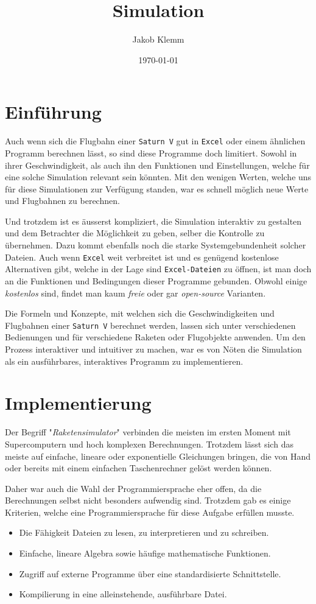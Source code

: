 \documentclass[11pt]{article}
\author{Jakob Klemm}
\date{\today}
\title{Simulation}
\begin{document}
\maketitle
\tableofcontents

\section{Einführung}
\label{sec:orgc7617af}
Auch wenn sich die Flugbahn einer \texttt{Saturn V} gut in \texttt{Excel} oder einem ähnlichen
Programm berechnen lässt, so sind diese Programme doch limitiert. Sowohl in
ihrer Geschwindigkeit, als auch ihn den Funktionen und Einstellungen, welche für
eine solche Simulation relevant sein könnten. Mit den wenigen Werten, welche uns
für diese Simulationen zur Verfügung standen, war es schnell möglich neue Werte
und Flugbahnen zu berechnen.

Und trotzdem ist es äusserst kompliziert, die Simulation interaktiv zu gestalten
und dem Betrachter die Möglichkeit zu geben, selber die Kontrolle zu übernehmen.
Dazu kommt ebenfalls noch die starke Systemgebundenheit solcher Dateien. Auch
wenn \texttt{Excel} weit verbreitet ist und es genügend kostenlose Alternativen gibt,
welche in der Lage sind \texttt{Excel-Dateien} zu öffnen, ist man doch an die Funktionen
und Bedingungen dieser Programme gebunden. Obwohl einige \emph{kostenlos} sind, findet
man kaum \emph{freie} oder gar \emph{open-source} Varianten.

Die Formeln und Konzepte, mit welchen sich die Geschwindigkeiten und Flugbahnen
einer \texttt{Saturn V} berechnet werden, lassen sich unter verschiedenen Bedienungen und
für verschiedene Raketen oder Flugobjekte anwenden. Um den Prozess interaktiver
und intuitiver zu machen, war es von Nöten die Simulation als ein ausführbares,
interaktives Programm zu implementieren.
\section{Implementierung}
\label{sec:orgc5299e9}
Der Begriff "\emph{Raketensimulator}" verbinden die meisten im ersten Moment mit
Supercomputern und hoch komplexen Berechnungen. Trotzdem lässt sich das meiste
auf einfache, lineare oder exponentielle Gleichungen bringen, die von Hand oder
bereits mit einem einfachen Taschenrechner gelöst werden können.

Daher war auch die Wahl der Programmiersprache eher offen, da die Berechnungen
selbst nicht besonders aufwendig sind. Trotzdem gab es einige Kriterien, welche
eine Programmiersprache für diese Aufgabe erfüllen musste.
\begin{itemize}
\item Die Fähigkeit Dateien zu lesen, zu interpretieren und zu schreiben.
\item Einfache, lineare Algebra sowie häufige mathematische Funktionen.
\item Zugriff auf externe Programme über eine standardisierte Schnittstelle.
\item Kompilierung in eine alleinstehende, ausführbare Datei.
\end{itemize}
\end{document}
